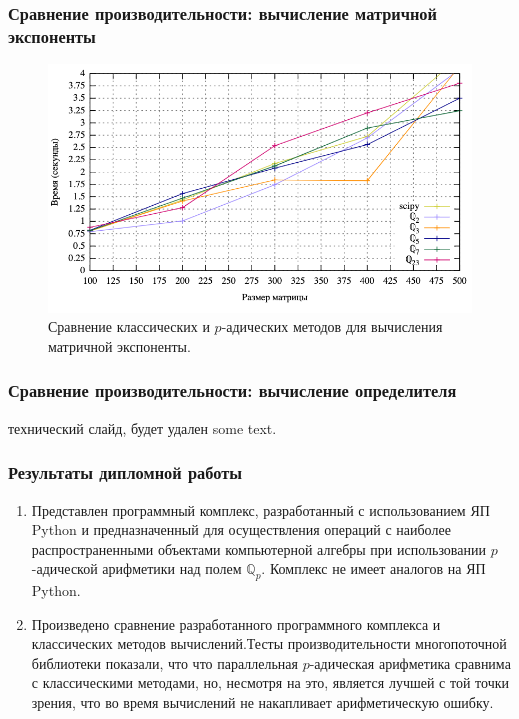 \documentclass[10pt,professionalfont,utf8,presentation,compress]{beamer}
\theoremstyle{definition}
\theoremstyle{plain}
\begin{document}
\begin{frame}
\frametitle{Сравнение производительности: вычисление матричной экспоненты}
\begin{figure}[H]
\centerline{\includegraphics[width=0.95\linewidth]{../gnuplot/exp/plot.png}}
\caption{Сравнение классических и $p$-адических методов для вычисления матричной экспоненты.}
\label{img:exp:plot}
\end{figure}
\end{frame}


\begin{frame}
\frametitle{Сравнение производительности: вычисление определителя}
	технический слайд, будет удален
	some text\cite{bib:algebra:1}\cite{bib:analisys:khrennikov:1}\cite{bib:analisys:khrennikov:2}\cite{bib:analisys:vv}\cite{bib:analysis:baker}\cite{bib:analysis:vladimirov}.
\end{frame}

\begin{frame}
    \frametitle{Результаты дипломной работы}
    \begin{enumerate}
        \item Представлен программный комплекс, разработанный с использованием ЯП Python и предназначенный для осуществления операций с наиболее распространенными объектами компьютерной алгебры при использовании $p$-адической арифметики над полем $\mathbb{Q}_p$. Комплекс не имеет аналогов на ЯП Python.
        \item Произведено сравнение разработанного программного комплекса и классических методов вычислений.Тесты производительности многопоточной библиотеки показали, что что параллельная $p$-адическая арифметика сравнима с классическими методами, но, несмотря на это, является лучшей с той точки зрения, что во время вычислений не накапливает арифметическую ошибку.
    \end{enumerate}    
\end{frame}
\end{document}
